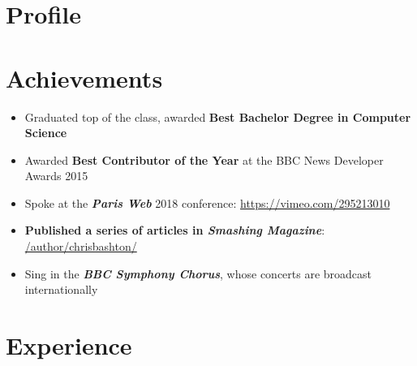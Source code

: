 \documentclass[letterpaper]{twentysecondcv} %
\begin{document}
\makeprofile %

\section{Profile}
\cvsummary

\section{Achievements}
\begin{itemize}[itemsep=-.5mm] %
    \item Graduated top of the class, awarded \textbf{Best Bachelor Degree in Computer Science}

    \item Awarded \textbf{Best Contributor of the Year} at the BBC News Developer Awards 2015

    \item Spoke at the \textbf{\emph{Paris Web}} 2018 conference: \url{https://vimeo.com/295213010}

    \item \textbf{Published a series of articles in \emph{Smashing Magazine}}: \href{https://www.smashingmagazine.com/author/chrisbashton/}{/author/chrisbashton/}

    \item Sing in the \textbf{\emph{BBC Symphony Chorus}}, whose concerts are broadcast internationally
\end{itemize}


\section{Experience}
\end{document}
